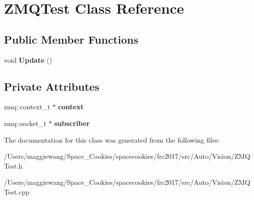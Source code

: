 \hypertarget{class_z_m_q_test}{}\section{Z\+M\+Q\+Test Class Reference}
\label{class_z_m_q_test}
\subsection*{Public Member Functions}
\begin{DoxyCompactItemize}
\item 
\mbox{\label{class_z_m_q_test_ac1faea32929d288af0c9dcaf13322f44}} 
void {\bfseries Update} ()
\end{DoxyCompactItemize}
\subsection*{Private Attributes}
\begin{DoxyCompactItemize}
\item 
\mbox{\label{class_z_m_q_test_a02d8adadf7024abd80076a746d5ddefc}} 
zmq\+::context\+\_\+t $\ast$ {\bfseries context}
\item 
\mbox{\label{class_z_m_q_test_a4d4191d10f215c75f40e536cdd86f09b}} 
zmq\+::socket\+\_\+t $\ast$ {\bfseries subscriber}
\end{DoxyCompactItemize}


The documentation for this class was generated from the following files\+:\begin{DoxyCompactItemize}
\item 
/\+Users/maggiewang/\+Space\+\_\+\+Cookies/spacecookies/frc2017/src/\+Auto/\+Vision/Z\+M\+Q\+Test.\+h\item 
/\+Users/maggiewang/\+Space\+\_\+\+Cookies/spacecookies/frc2017/src/\+Auto/\+Vision/Z\+M\+Q\+Test.\+cpp\end{DoxyCompactItemize}
